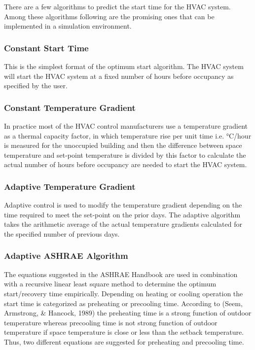 There are a few algorithms to predict the start time for the HVAC system. Among these algorithms following are the promising ones that can be implemented in a simulation environment.

\subsubsection{Constant Start Time}\label{constant-start-time}

This is the simplest format of the optimum start algorithm. The HVAC system will start the HVAC system at a fixed number of hours before occupancy as specified by the user.

\subsubsection{Constant Temperature Gradient}\label{constant-temperature-gradient}

In practice most of the HVAC control manufacturers use a temperature gradient as a thermal capacity factor, in which temperature rise per unit time i.e. °C/hour is measured for the unoccupied building and then the difference between space temperature and set-point temperature is divided by this factor to calculate the actual number of hours before occupancy are needed to start the HVAC system.

\subsubsection{Adaptive Temperature Gradient}\label{adaptive-temperature-gradient}

Adaptive control is used to modify the temperature gradient depending on the time required to meet the set-point on the prior days. The adaptive algorithm takes the arithmetic average of the actual temperature gradients calculated for the specified number of previous days.

\subsubsection{Adaptive ASHRAE Algorithm}\label{adaptive-ashrae-algorithm}

The equations suggested in the ASHRAE Handbook are used in combination with a recursive linear least square method to determine the optimum start/recovery time empirically. Depending on heating or cooling operation the start time is categorized as preheating or precooling time. According to (Seem, Armstrong, \& Hancock, 1989) the preheating time is a strong function of outdoor temperature whereas precooling time is not strong function of outdoor temperature if space temperature is close or less than the setback temperature. Thus, two different equations are suggested for preheating and precooling time.

